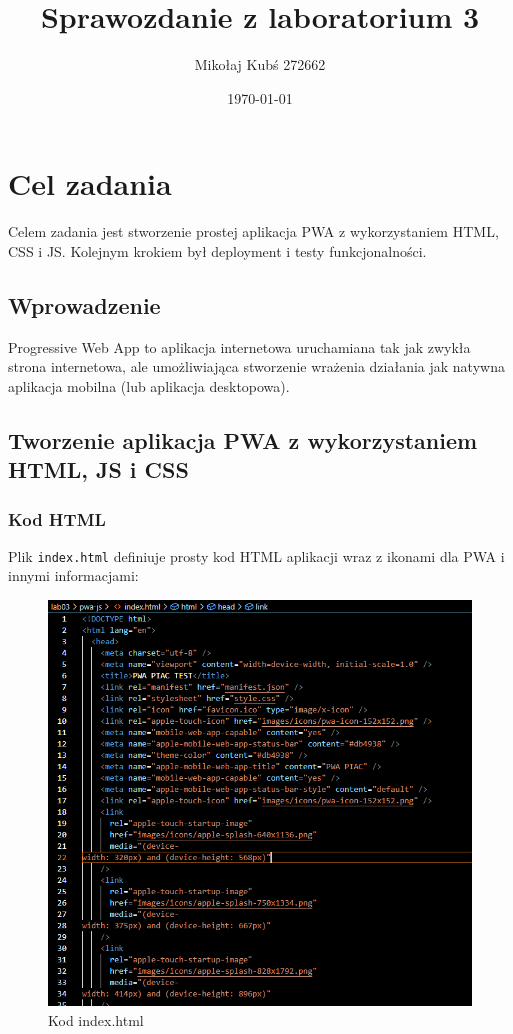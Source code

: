 \documentclass[a4paper,12pt]{article}
\title{Sprawozdanie z laboratorium 3}
\author{Mikołaj Kubś 272662}
\date{\today}
\begin{document}
\maketitle

\section{Cel zadania}

Celem zadania jest stworzenie prostej aplikacja PWA z wykorzystaniem HTML, CSS i JS. Kolejnym krokiem był deployment i testy funkcjonalności.

\subsection{Wprowadzenie}

Progressive Web App to aplikacja internetowa uruchamiana tak jak zwykła strona internetowa, ale
umożliwiająca stworzenie wrażenia działania jak natywna aplikacja mobilna (lub aplikacja
desktopowa).

\subsection{Tworzenie aplikacja PWA z wykorzystaniem HTML, JS i CSS}

\subsubsection{Kod HTML}
Plik \texttt{index.html} definiuje prosty kod HTML aplikacji wraz z ikonami dla PWA i innymi informacjami:

\begin{figure}[H]
    \centering
    \includegraphics[width=1\textwidth]{images/index_html.png}
    \caption{Kod index.html}
\end{figure}
\end{document}
